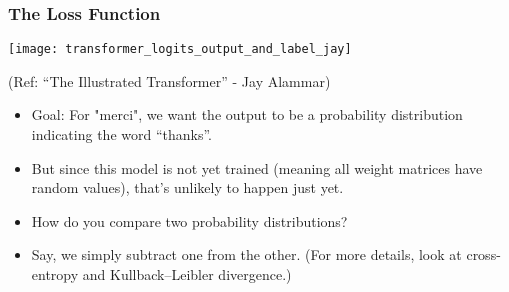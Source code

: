 \begin{frame}[fragile]\frametitle{The Loss Function}

\begin{center}
\texttt{[image: transformer\_logits\_output\_and\_label\_jay]}


{\tiny (Ref: ``The Illustrated Transformer'' - Jay Alammar)}
\end{center}		


\begin{itemize}
\item Goal: For "merci", we want the output to be a probability distribution indicating the word “thanks”. 
\item But since this model is not yet trained (meaning all weight matrices have random values), that’s unlikely to happen just yet.
\end{itemize}

\begin{itemize}
\item How do you compare two probability distributions? 
\item Say, we simply subtract one from the other. (For more details, look at cross-entropy and Kullback–Leibler divergence.)
\end{itemize}


\end{frame}

